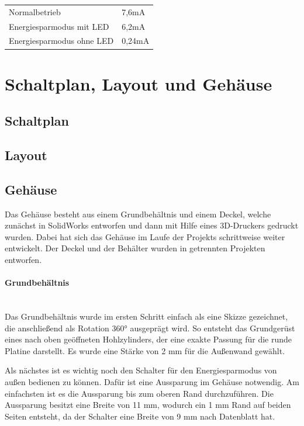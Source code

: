 \documentclass[a4paper,
DIV=13,
12pt,
BCOR=10mm,
department=FakEI,
parskip=half,
automark,
]{article}
\begin{document}
\begin{center}
\begin{tabularx}{\columnwidth}{XX}
Normalbetrieb & 7,6mA \\ 
Energiesparmodus mit LED & 6,2mA\\
Energiesparmodus ohne LED & 0,24mA
\label{tab:ADEinton}
\end{tabularx}
\end{center}





\newpage
\section{Schaltplan, Layout und Gehäuse}
\subsection{Schaltplan}

\subsection{Layout}

\subsection{Gehäuse}
Das Gehäuse besteht aus einem Grundbehältnis und einem Deckel, welche zunächst in SolidWorks entworfen und dann mit Hilfe eines 3D-Druckers gedruckt wurden. Dabei hat sich das Gehäuse im Laufe der Projekts schrittweise weiter entwickelt. Der Deckel und der Behälter wurden in getrennten Projekten entworfen. 

\paragraph{Grundbehältnis} $~$ \\
Das Grundbehältnis wurde im ersten Schritt einfach als eine Skizze gezeichnet, die anschließend als Rotation 360° ausgeprägt wird. So entsteht das Grundgerüst eines nach oben geöffneten Hohlzylinders, der eine exakte Passung für die runde Platine darstellt. Es wurde eine Stärke von 2 mm für die Außenwand gewählt. 

Als nächstes ist es wichtig noch den Schalter für den Energiesparmodus von außen bedienen zu können. Dafür ist eine Aussparung im Gehäuse notwendig. Am einfachsten ist es die Aussparung bis zum oberen Rand durchzuführen. Die Aussparung besitzt eine Breite von 11 mm, wodurch ein 1 mm Rand auf beiden Seiten entsteht, da der Schalter eine Breite von 9 mm nach Datenblatt hat. 
\end{document}
